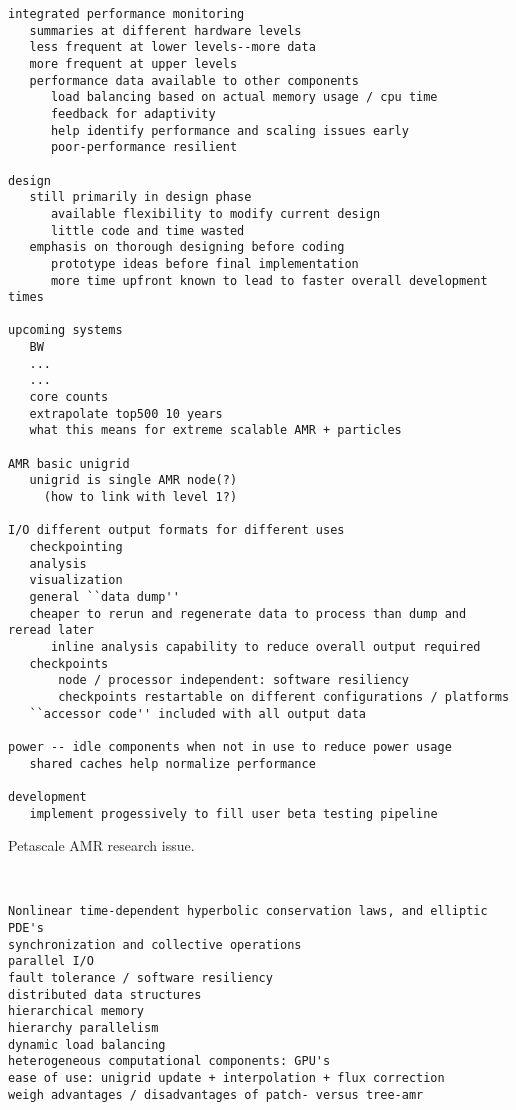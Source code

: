 \documentclass[14pt,letter]{article}
\begin{document}
\begin{verbatim}
integrated performance monitoring
   summaries at different hardware levels
   less frequent at lower levels--more data
   more frequent at upper levels
   performance data available to other components
      load balancing based on actual memory usage / cpu time
      feedback for adaptivity
      help identify performance and scaling issues early
      poor-performance resilient

design
   still primarily in design phase
      available flexibility to modify current design
      little code and time wasted
   emphasis on thorough designing before coding
      prototype ideas before final implementation
      more time upfront known to lead to faster overall development times

upcoming systems
   BW
   ...
   ...
   core counts
   extrapolate top500 10 years
   what this means for extreme scalable AMR + particles

AMR basic unigrid
   unigrid is single AMR node(?)
     (how to link with level 1?)

I/O different output formats for different uses
   checkpointing
   analysis
   visualization
   general ``data dump''
   cheaper to rerun and regenerate data to process than dump and reread later
      inline analysis capability to reduce overall output required
   checkpoints
       node / processor independent: software resiliency
       checkpoints restartable on different configurations / platforms
   ``accessor code'' included with all output data

power -- idle components when not in use to reduce power usage
   shared caches help normalize performance

development
   implement progessively to fill user beta testing pipeline
\end{verbatim}

Petascale AMR research issue.

\ \\ 

\begin{verbatim}
Nonlinear time-dependent hyperbolic conservation laws, and elliptic PDE's
synchronization and collective operations
parallel I/O
fault tolerance / software resiliency
distributed data structures
hierarchical memory
hierarchy parallelism
dynamic load balancing
heterogeneous computational components: GPU's
ease of use: unigrid update + interpolation + flux correction
weigh advantages / disadvantages of patch- versus tree-amr
\end{verbatim}
\end{document}
